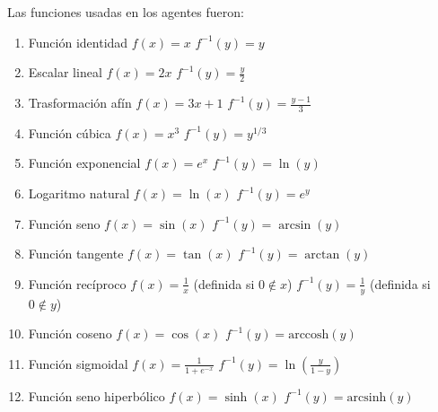     Las funciones usadas en los agentes fueron: \\
    \begin{enumerate}
        
        \item  Función identidad
           \( f(x) = x \)  
           \( f^{-1}(y) = y \)
        
           \item  Escalar lineal  
           \( f(x) = 2x \)  
           \( f^{-1}(y) = \frac{y}{2} \)
        
           \item  Trasformación afín
           \( f(x) = 3x + 1 \)  
           \( f^{-1}(y) = \frac{y - 1}{3} \)
        
           \item  Función cúbica
           \( f(x) = x^3 \)  
           \( f^{-1}(y) = y^{1/3} \)
        
           \item  Función exponencial  
           \( f(x) = e^x \)  
           \( f^{-1}(y) = \ln(y) \)
        
           \item  Logaritmo natural
           \( f(x) = \ln(x) \)  
           \( f^{-1}(y) = e^y \)
        
           \item  Función seno
           \( f(x) = \sin(x) \)  
           \( f^{-1}(y) = \arcsin(y) \)
        
           \item  Función tangente  
           \( f(x) = \tan(x) \)  
           \( f^{-1}(y) = \arctan(y) \)
        
           \item  Función recíproco  
           \( f(x) = \frac{1}{x} \) (definida si \( 0 \notin x \))  
           \( f^{-1}(y) = \frac{1}{y} \) (definida si \( 0 \notin y \))  
           
        
           \item  Función coseno
            \( f(x) = \cos(x) \)  
            \( f^{-1}(y) = \text{arccosh}(y) \)  
            
        
            \item  Función sigmoidal
            \( f(x) = \frac{1}{1 + e^{-x}} \)  
            \( f^{-1}(y) = \ln\left(\frac{y}{1 - y}\right) \)
        
            \item  Función seno hiperbólico
            \( f(x) = \sinh(x) \)  
            \( f^{-1}(y) = \text{arcsinh}(y) \)  
            

\end{enumerate}
